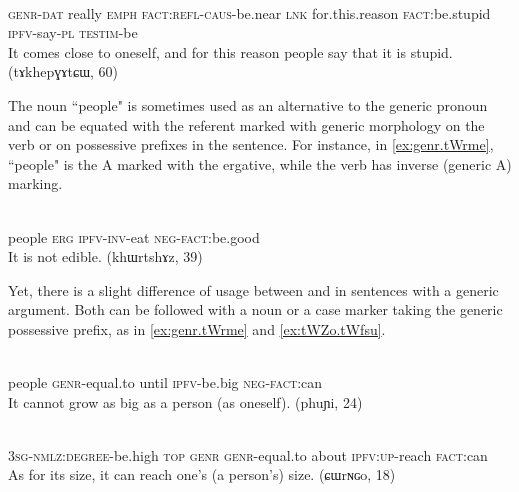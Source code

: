 \begin{exe}
\ex  \label{ex:tWCki}
\gll
{} 	 	 	 	 	 	 	 	 \\
\textsc{genr-dat} really \textsc{emph} \textsc{fact:refl-caus}-be.near \textsc{lnk} for.this.reason \textsc{fact}:be.stupid \textsc{ipfv}-say-\textsc{pl} \textsc{testim}-be \\
\glt It comes close to oneself, and for this reason people say that it is stupid. (tɤkhepɣɤtɕɯ, 60)
\end{exe}

The noun  ``people" is sometimes used as an alternative to the generic pronoun  and can be equated with the referent marked with generic morphology on the verb or on possessive prefixes in the sentence. For instance, in \ref{ex:genr.tWrme},  ``people" is the A marked with the ergative, while the verb has inverse (generic A) marking.


\begin{exe}
\ex  \label{ex:genr.tWrme}
\gll
{} 	 	 	 \\
people \textsc{erg} \textsc{ipfv-inv}-eat \textsc{neg-fact}:be.good \\
\glt It is not edible. (khɯrtshɤz, 39)
\end{exe}

Yet, there is a slight difference of usage between  and  in sentences with a generic argument. Both can be followed with a noun or a case marker taking the generic possessive prefix, as in \ref{ex:genr.tWrme} and \ref{ex:tWZo.tWfsu}. 

\begin{exe}
\ex  \label{ex:genr.tWrme}
\gll
{} 	 	 	 	 \\
people \textsc{genr}-equal.to until \textsc{ipfv}-be.big \textsc{neg-fact}:can \\ 
\glt It cannot grow as big as a person (as oneself). (phuɲi, 24)
\end{exe}

\begin{exe}
\ex  \label{ex:tWZo.tWfsu}
\gll
{} 	 	 	 	 	 	  \\
\textsc{3sg-nmlz:degree}-be.high \textsc{top} \textsc{genr} \textsc{genr}-equal.to about \textsc{ipfv:up}-reach \textsc{fact}:can \\
\glt As for its size, it can reach one's (a person's) size. (ɕɯrɴɢo, 18)
\end{exe}

